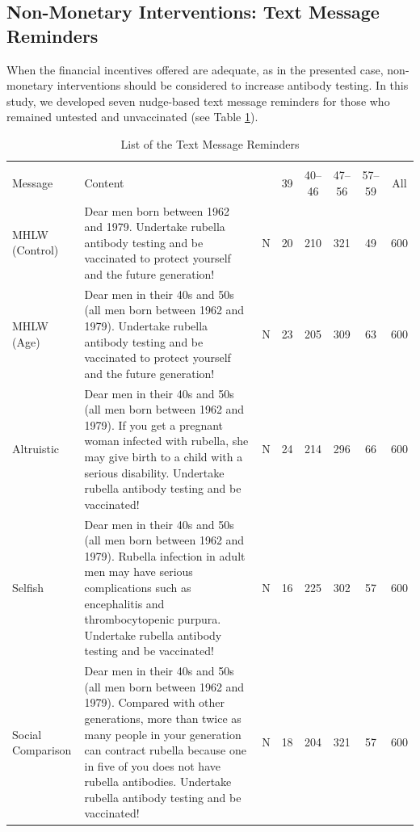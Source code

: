 \documentclass[
  11pt,
  a4paper
]{article}
\begin{document}
\hypertarget{intervention}{%
\subsection{Non-Monetary Interventions: Text Message Reminders}\label{intervention}}

When the financial incentives offered are adequate, as in the presented case, non-monetary interventions should be considered to increase antibody testing. In this study, we developed seven nudge-based text message reminders for those who remained untested and unvaccinated (see Table \ref{tab:message-list}).

\begin{table}

\caption{\label{tab:message-list}List of the Text Message Reminders}
\centering
\fontsize{9}{11}\selectfont
\begin{tabular}[t]{l>{\raggedright\arraybackslash}p{20em}cccccc}
\toprule
\multicolumn{3}{c}{ } & \multicolumn{4}{c}{Age (as of April 2019)} & \multicolumn{1}{c}{ } \\
\cmidrule(l{3pt}r{3pt}){4-7}
Message & Content &   & 39 & 40--46 & 47--56 & 57--59 & All\\
\midrule
MHLW (Control) & Dear men born between 1962 and 1979. Undertake rubella antibody testing and be vaccinated to protect yourself and the future generation! & N & 20 & 210 & 321 & 49 & 600\\
\addlinespace
MHLW (Age) & Dear men in their 40s and 50s (all men born between 1962 and 1979). Undertake rubella antibody testing and be vaccinated to protect yourself and the future generation! & N & 23 & 205 & 309 & 63 & 600\\
\addlinespace
Altruistic & Dear men in their 40s and 50s (all men born between 1962 and 1979). If you get a pregnant woman infected with rubella, she may give birth to a child with a serious disability. Undertake rubella antibody testing and be vaccinated! & N & 24 & 214 & 296 & 66 & 600\\
\addlinespace
Selfish & Dear men in their 40s and 50s (all men born between 1962 and 1979). Rubella infection in adult men may have serious complications such as encephalitis and thrombocytopenic purpura. Undertake rubella antibody testing and be vaccinated! & N & 16 & 225 & 302 & 57 & 600\\
\addlinespace
Social Comparison & Dear men in their 40s and 50s (all men born between 1962 and 1979). Compared with other generations, more than twice as many people in your generation can contract rubella because one in five of you does not have rubella antibodies. Undertake rubella antibody testing and be vaccinated! & N & 18 & 204 & 321 & 57 & 600\\

\end{tabular}
\end{table}
\end{document}
